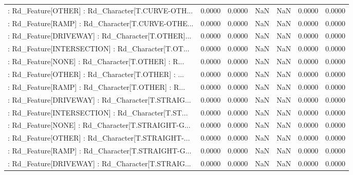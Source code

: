 \begin{longtable}{p{4cm}cccccc}
 : Rd\_Feature[OTHER] : Rd\_Character[T.CURVE-OTH... &            0.0000 &            0.0000 &     NaN &          NaN &             0.0000 &            0.0000 \\
 : Rd\_Feature[RAMP] : Rd\_Character[T.CURVE-OTHE... &            0.0000 &            0.0000 &     NaN &          NaN &             0.0000 &            0.0000 \\
 : Rd\_Feature[DRIVEWAY] : Rd\_Character[T.OTHER]... &            0.0000 &            0.0000 &     NaN &          NaN &             0.0000 &            0.0000 \\
 : Rd\_Feature[INTERSECTION] : Rd\_Character[T.OT... &            0.0000 &            0.0000 &     NaN &          NaN &             0.0000 &            0.0000 \\
 : Rd\_Feature[NONE] : Rd\_Character[T.OTHER] : R... &            0.0000 &            0.0000 &     NaN &          NaN &             0.0000 &            0.0000 \\
 : Rd\_Feature[OTHER] : Rd\_Character[T.OTHER] : ... &            0.0000 &            0.0000 &     NaN &          NaN &             0.0000 &            0.0000 \\
 : Rd\_Feature[RAMP] : Rd\_Character[T.OTHER] : R... &            0.0000 &            0.0000 &     NaN &          NaN &             0.0000 &            0.0000 \\
 : Rd\_Feature[DRIVEWAY] : Rd\_Character[T.STRAIG... &            0.0000 &            0.0000 &     NaN &          NaN &             0.0000 &            0.0000 \\
 : Rd\_Feature[INTERSECTION] : Rd\_Character[T.ST... &            0.0000 &            0.0000 &     NaN &          NaN &             0.0000 &            0.0000 \\
 : Rd\_Feature[NONE] : Rd\_Character[T.STRAIGHT-G... &            0.0000 &            0.0000 &     NaN &          NaN &             0.0000 &            0.0000 \\
 : Rd\_Feature[OTHER] : Rd\_Character[T.STRAIGHT-... &            0.0000 &            0.0000 &     NaN &          NaN &             0.0000 &            0.0000 \\
 : Rd\_Feature[RAMP] : Rd\_Character[T.STRAIGHT-G... &            0.0000 &            0.0000 &     NaN &          NaN &             0.0000 &            0.0000 \\
 : Rd\_Feature[DRIVEWAY] : Rd\_Character[T.STRAIG... &            0.0000 &            0.0000 &     NaN &          NaN &             0.0000 &            0.0000 \\

\end{longtable}
